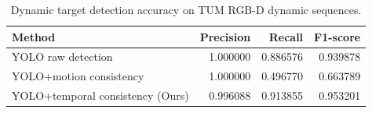 \begin{table}[t]
\centering
\caption{Dynamic target detection accuracy on TUM RGB-D dynamic sequences.}
\label{tab:dynamic_detection_accuracy}
\begin{tabular}{lrrr}
\toprule
Method & Precision & Recall & F1-score \\
\midrule
YOLO raw detection & 1.000000 & 0.886576 & 0.939878 \\
YOLO+motion consistency & 1.000000 & 0.496770 & 0.663789 \\
YOLO+temporal consistency (Ours) & 0.996088 & 0.913855 & 0.953201 \\
\bottomrule
\end{tabular}
\end{table}
